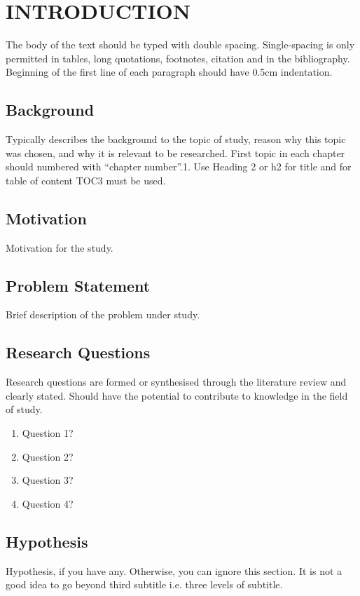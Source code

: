 
\chapter{INTRODUCTION}\thispagestyle{EmptyHeader}
\label{chp:1}

The body of the text should be typed with double spacing. Single-spacing is only permitted in tables, long quotations, footnotes, citation and in the bibliography.
Beginning of the first line of each paragraph should have 0.5cm indentation.

\section{Background}
Typically describes the background to the topic of study, reason why this topic was chosen, and why it is relevant to be researched. 
First topic in each chapter should numbered with “chapter number”.1. Use Heading 2 or h2 for title and for table of content TOC3 must be used.
\section{Motivation}
Motivation for the study.
\section{Problem Statement}
Brief description of the problem under study. 
\section{Research Questions}
Research questions are formed or synthesised through the literature review and clearly stated. Should have the potential to contribute to knowledge in the field of study.

\begin{enumerate}
	\item Question 1?
	\item Question 2?
	\item Question 3?
	\item Question 4?
\end{enumerate}
\section{Hypothesis}
Hypothesis, if you have any. Otherwise, you can ignore this section.
It is not a good idea to go beyond third subtitle i.e. three levels of subtitle.

